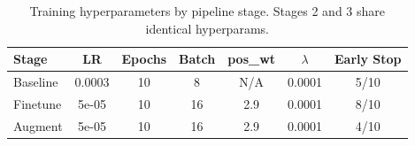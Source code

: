\begin{table}[htbp]
\centering
\caption{Training hyperparameters by pipeline stage. Stages 2 and 3 share identical hyperparams.}
\label{tab:training_config}
\begin{tabular}{lcccccc}
\toprule
\textbf{Stage} & LR & Epochs & Batch & pos\_wt & $\lambda$ & Early Stop \\
\midrule
Baseline & 0.0003 & 10 & 8 & N/A & 0.0001 & 5/10 \\
Finetune & 5e-05 & 10 & 16 & 2.9 & 0.0001 & 8/10 \\
Augment & 5e-05 & 10 & 16 & 2.9 & 0.0001 & 4/10 \\
\bottomrule
\end{tabular}
\end{table}
